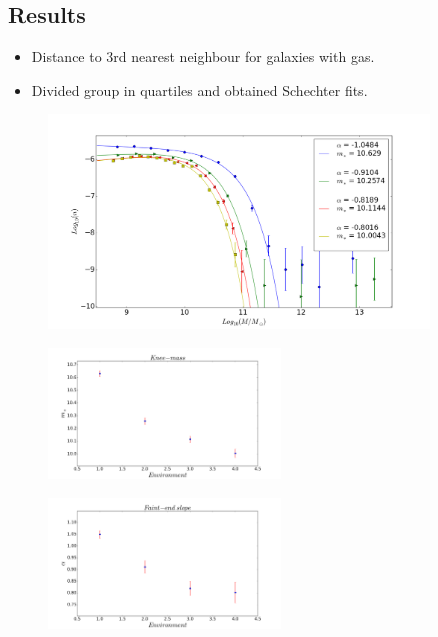 \documentclass[xcolor=dvipsnames]{beamer}
\begin{document}
\subsection{Results}
\begin{frame}
\begin{itemize}
			\item Distance to 3rd nearest neighbour for galaxies with gas.
			\item Divided group in quartiles and obtained Schechter fits.
\end{itemize}
\begin{figure}[h!]
\centering
\includegraphics[width=0.9\textwidth]{environment1}
\centering
\end{figure}
\end{frame}
\begin{frame}
\begin{figure}[h!]
        \includegraphics[width=0.55\textwidth]{m1}
\end{figure}
\begin{figure}[h!]
	\includegraphics[width=0.55\textwidth]{alpha1}
\end{figure}
\end{frame}
\end{document}
